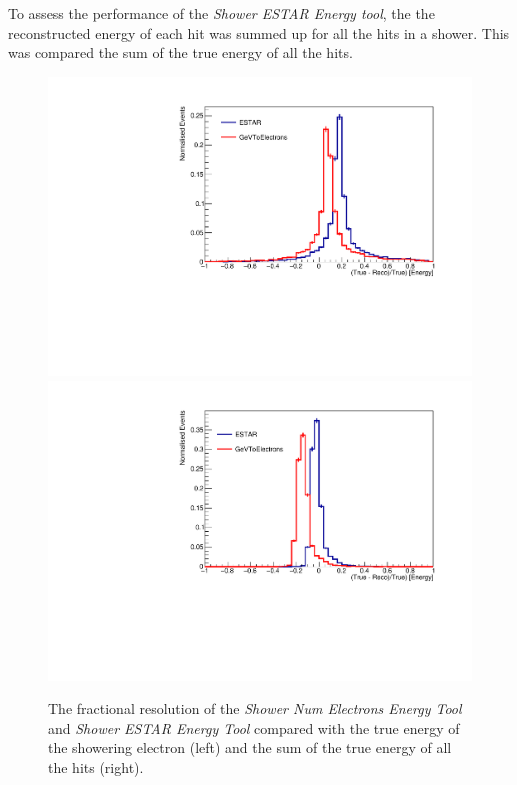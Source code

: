 To assess the performance of the \textit{Shower ESTAR Energy tool}, the the reconstructed energy of each hit was summed up for all the hits in a shower. This was compared the sum of the true energy of all the hits.


\begin{figure}
    \centering
    \includegraphics[width = \smallfigwidth]{figures-chap4/ESTAR_kGeVElectrons_true_showering.pdf}
    \includegraphics[width = \smallfigwidth]{figures-chap4/ESTAR_kGeVElectrons_true_hit.pdf}
    \caption{The fractional resolution of the \textit{Shower Num Electrons Energy Tool} and \textit{Shower ESTAR Energy Tool} compared with the true energy of the showering electron (left) and the sum of the true energy of all the hits (right). }
    \label{fig:my_label}
\end{figure}

